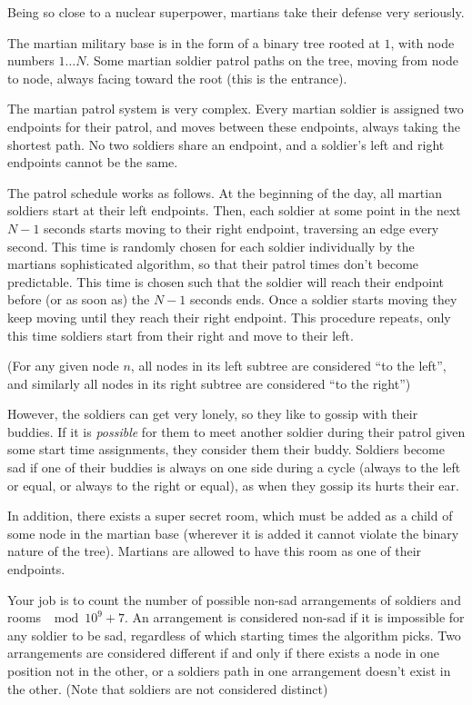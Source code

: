 
Being so close to a nuclear superpower, martians take their defense very seriously.

The martian military base is in the form of a binary tree rooted at $1$, with node numbers $1 \dots N$. Some martian soldier patrol paths on the tree, moving from node to node, always facing toward the root (this is the entrance). 

The martian patrol system is very complex. Every martian soldier is assigned two endpoints for their patrol, and moves between these endpoints, always taking the shortest path. No two soldiers share an endpoint, and a soldier's left and right endpoints cannot be the same.

The patrol schedule works as follows. At the beginning of the day, all martian soldiers start at their left endpoints. Then, each soldier at some point in the next $N-1$ seconds starts moving to their right endpoint, traversing an edge every second. This time is randomly chosen for each soldier individually by the martians sophisticated algorithm, so that their patrol times don't become predictable. This time is chosen such that the soldier will reach their endpoint before (or as soon as) the $N-1$ seconds ends. Once a soldier starts moving they keep moving until they reach their right endpoint. This procedure repeats, only this time soldiers start from their right and move to their left.

(For any given node $n$, all nodes in its left subtree are considered ``to the left'', and similarly all nodes in its right subtree are considered ``to the right'') 

However, the soldiers can get very lonely, so they like to gossip with their buddies. If it is \emph{possible} for them to meet another soldier during their patrol given some start time assignments, they consider them their buddy. Soldiers become sad if one of their buddies is always on one side during a cycle (always to the left or equal, or always to the right or equal), as when they gossip its hurts their ear. 

In addition, there exists a super secret room, which must be added as a child of some node in the martian base (wherever it is added it cannot violate the binary nature of the tree). Martians are allowed to have this room as one of their endpoints.

Your job is to count the number of possible non-sad arrangements of soldiers and rooms $\mod 10^9 + 7$. An arrangement is considered non-sad if it is impossible for any soldier to be sad, regardless of which starting times the algorithm picks. Two arrangements are considered different if and only if there exists a node in one position not in the other, or a soldiers path in one arrangement doesn't exist in the other. (Note that soldiers are not considered distinct)

